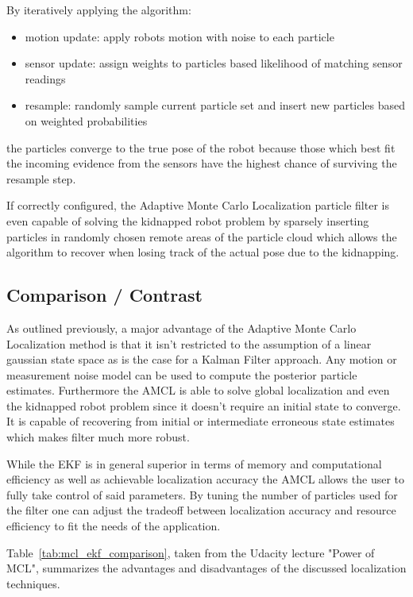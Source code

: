 \documentclass[10pt,journal,compsoc]{IEEEtran}
\begin{document}
By iteratively applying the algorithm:
\begin{itemize}      
      \item motion update: apply robots motion with noise to each particle
      \item sensor update: assign weights to particles based likelihood of matching sensor readings
      \item resample: randomly sample current particle set and insert new particles based on weighted probabilities
\end{itemize}
the particles converge to the true pose of the robot because those which best fit the incoming evidence from the sensors have the highest chance of surviving the resample step.

If correctly configured, the Adaptive Monte Carlo Localization particle filter is even capable of solving the kidnapped robot problem by sparsely inserting particles in randomly chosen remote areas of the particle cloud which allows the algorithm to recover when losing track of the actual pose due to the kidnapping.


\subsection{Comparison / Contrast}

As outlined previously, a major advantage of the Adaptive Monte Carlo Localization method is that it isn't restricted to the assumption of a linear gaussian state space as is the case for a Kalman Filter approach. Any motion or measurement noise model can be used to compute the posterior particle estimates. Furthermore the AMCL is able to solve global localization and even the kidnapped robot problem since it doesn't require an initial state to converge. It is capable of recovering from initial or intermediate erroneous state estimates which makes filter much more robust. 

While the EKF is in general superior in terms of memory and computational efficiency as well as achievable localization accuracy the AMCL allows the user to fully take control of said parameters. By tuning the number of particles used for the filter one can adjust the tradeoff between localization accuracy and resource efficiency to fit the needs of the application.

Table~\ref{tab:mcl_ekf_comparison}, taken from the Udacity lecture "Power of MCL", summarizes the advantages and disadvantages of the discussed localization techniques.
\end{document}
